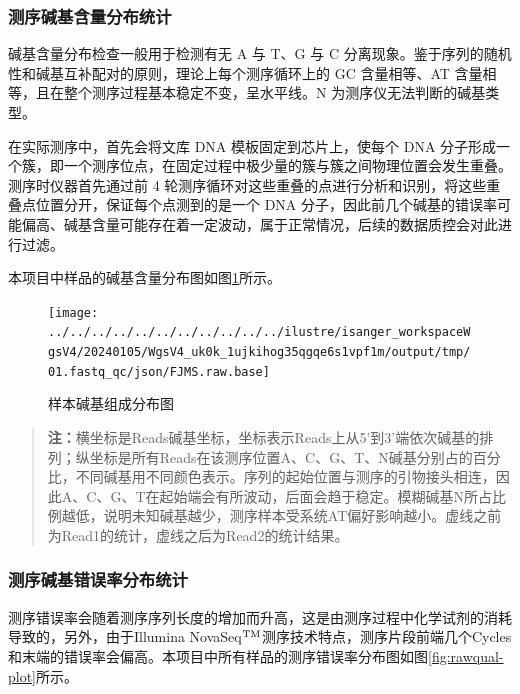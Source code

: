 \documentclass[
  a4paper,
  titlepage]{article}
\begin{document}
\hypertarget{ux6d4bux5e8fux78b1ux57faux542bux91cfux5206ux5e03ux7edfux8ba1}{%
\subsubsection{测序碱基含量分布统计}\label{ux6d4bux5e8fux78b1ux57faux542bux91cfux5206ux5e03ux7edfux8ba1}}

碱基含量分布检查一般用于检测有无 A 与 T、G 与 C 分离现象。鉴于序列的随机性和碱基互补配对的原则，理论上每个测序循环上的 GC 含量相等、AT 含量相等，且在整个测序过程基本稳定不变，呈水平线。N 为测序仪无法判断的碱基类型。

在实际测序中，首先会将文库 DNA 模板固定到芯片上，使每个 DNA 分子形成一个簇，即一个测序位点，在固定过程中极少量的簇与簇之间物理位置会发生重叠。测序时仪器首先通过前 4 轮测序循环对这些重叠的点进行分析和识别，将这些重叠点位置分开，保证每个点测到的是一个 DNA 分子，因此前几个碱基的错误率可能偏高、碱基含量可能存在着一定波动，属于正常情况，后续的数据质控会对此进行过滤。

本项目中样品的碱基含量分布图如图\ref{fig:rawbase-plot}所示。

\begin{figure}[H]

{\centering \texttt{[image: ../../../../../../../../../../../ilustre/isanger\_workspaceWgsV4/20240105/WgsV4\_uk0k\_1ujkihog35qgqe6s1vpf1m/output/tmp/01.fastq\_qc/json/FJMS.raw.base]} 

}

\caption{样本碱基组成分布图}\label{fig:rawbase-plot}
\end{figure}

\begin{quote}
\textbf{注：}横坐标是Reads碱基坐标，坐标表示Reads上从5'到3'端依次碱基的排列；纵坐标是所有Reads在该测序位置A、C、G、T、N碱基分别占的百分比，不同碱基用不同颜色表示。序列的起始位置与测序的引物接头相连，因此A、C、G、T在起始端会有所波动，后面会趋于稳定。模糊碱基N所占比例越低，说明未知碱基越少，测序样本受系统AT偏好影响越小。虚线之前为Read1的统计，虚线之后为Read2的统计结果。
\end{quote}

\hypertarget{ux6d4bux5e8fux78b1ux57faux9519ux8befux7387ux5206ux5e03ux7edfux8ba1}{%
\subsubsection{测序碱基错误率分布统计}\label{ux6d4bux5e8fux78b1ux57faux9519ux8befux7387ux5206ux5e03ux7edfux8ba1}}

测序错误率会随着测序序列长度的增加而升高，这是由测序过程中化学试剂的消耗导致的，另外，由于Illumina NovaSeq\(\rm{^{TM}}\)测序技术特点，测序片段前端几个Cycles和末端的错误率会偏高。本项目中所有样品的测序错误率分布图如图\ref{fig:rawqual-plot}所示。
\end{document}
